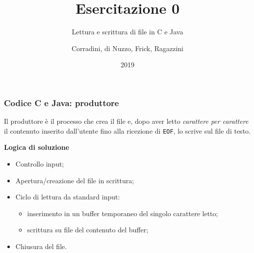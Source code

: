 \documentclass{beamer}
\begin{document}
\title{Esercitazione 0}
\subtitle{Lettura e scrittura di file in C e Java}
\author{Corradini, di Nuzzo, Frick, Ragazzini}
\date{2019}
\begin{frame}
	\titlepage
\end{frame}
\begin{frame}
\frametitle{Codice C e Java: produttore}
Il produttore è il processo che crea il file e, dopo aver letto \textit{carattere per carattere} il contenuto inserito dall'utente fino alla ricezione di \texttt{EOF}, lo scrive sul file di testo.

\textbf{Logica di soluzione}
\begin{itemize}
\item Controllo input;
\item Apertura/creazione del file in scrittura;
\item Ciclo di lettura da standard input:
\begin{itemize}
\item inserimento in un buffer temporaneo del singolo carattere letto;
\item scrittura su file del contenuto del buffer;
\end{itemize}
\item Chiusura del file.
\end{itemize}
\end{frame}
\end{document}
